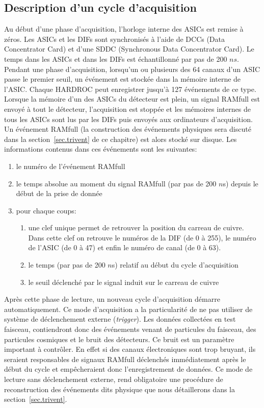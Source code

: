 \subsection{Description d'un cycle d'acquisition}
Au début d'une phase d'acquisition, l'horloge interne des ASICs est remise à zéros. Les ASICs et les DIFs sont synchronisés à l'aide de DCCs (Data Concentrator Card) et d'une SDDC (Synchronous Data Concentrator Card). Le temps dans les ASICs et dans les DIFs est échantillonné par pas de 200 $ns$. Pendant une phase d'acquisition, lorsqu'un ou plusieurs des 64 canaux d'un ASIC passe le premier seuil, un événement est stockée dans la mémoire interne de l'ASIC. Chaque HARDROC peut enregistrer jusqu'à 127 événements de ce type. Lorsque la mémoire d'un des ASICs du détecteur est plein, un signal RAMfull est envoyé à tout le détecteur, l'acquisition est stoppée et les mémoires internes de tous les ASICs sont lus par les DIFs puis envoyés aux ordinateurs d’acquisition. Un événement RAMfull (la construction des événements physiques sera discuté dans la section~\ref{sec.trivent} de ce chapitre) est alors stocké sur disque. Les informations contenus dans ces événements sont les suivantes: 
\begin{enumerate}[1-]
\item le numéro de l'événement RAMfull
\item le temps absolue au moment du signal RAMfull (par pas de 200 $n$s) depuis le début de la prise de donnée
\item pour chaque coups:
  \begin{enumerate}[-]
    \item une clef unique permet de retrouver la position du carreau de cuivre. Dans cette clef on retrouve le numéros de la DIF (de 0 à 255), le numéro de l'ASIC (de 0 à 47) et enfin le numéro de canal (de 0 à 63).
    \item le temps (par pas de 200 $n$s) relatif au début du cycle d'acquisition
    \item le seuil déclenché par le signal induit sur le carreau de cuivre
  \end{enumerate}
\end{enumerate}
Après cette phase de lecture, un nouveau cycle d'acquisition démarre automatiquement. Ce mode d'acquisition a la particularité de ne pas utiliser de système de déclenchement externe ({\it{trigger}}). Les données collectées en test faisceau, contiendront donc des événements venant de particules du faisceau, des particules cosmiques et le bruit des détecteurs. Ce bruit est un paramètre important à contrôler. En effet si des canaux électroniques sont trop bruyant, ils seraient responsables de signaux RAMfull déclenchés immédiatement après le début du cycle et empêcheraient donc l'enregistrement de données. Ce mode de lecture sans déclenchement externe, rend obligatoire une procédure de reconstruction des événements dits physique que nous détaillerons dans la section~\ref{sec.trivent}.
\
